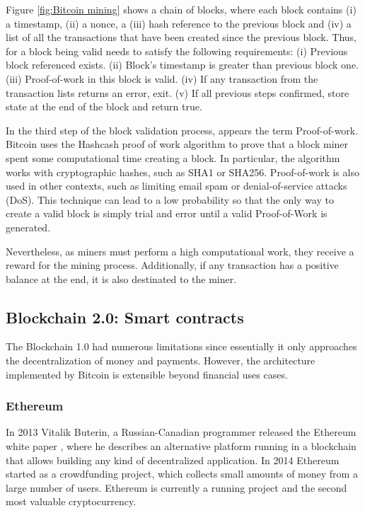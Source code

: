 Figure \ref{fig:Bitcoin mining} shows a chain of blocks, where each block contains (i) a timestamp, (ii) a nonce, a (iii) hash reference to the previous block and (iv) a list of all the transactions that have been created since the previous block. Thus, for a block being valid needs to satisfy the following requirements: \newline (i) Previous block referenced exists. (ii) Block's timestamp is greater than previous block one. (iii) Proof-of-work in this block is valid. (iv) If any transaction from the transaction lists returns an error, exit. (v) If all previous steps confirmed, store state at the end of the block and return true.

In the third step of the block validation process, appears the term Proof-of-work. Bitcoin uses the Hashcash proof of work algorithm to prove that a block miner spent some computational time creating a block. In particular, the algorithm works with cryptographic hashes, such as SHA1 or SHA256. Proof-of-work is also used in other contexts, such as limiting email spam or denial-of-service attacks (DoS). This technique can lead to a low probability so that the only way to create a valid block is simply trial and error until a valid Proof-of-Work is generated.

Nevertheless, as miners must perform a high computational work, they receive a reward for the mining process. Additionally, if any transaction has a positive balance at the end, it is also destinated to the miner.


\subsection{Blockchain 2.0: Smart contracts}

The Blockchain 1.0 had numerous limitations since essentially it only approaches the decentralization of money and payments. However, the architecture implemented by Bitcoin is extensible beyond financial uses cases.

\subsubsection{Ethereum}

In 2013 Vitalik Buterin, a Russian-Canadian programmer released the Ethereum white paper \cite{buterin2014next}, where he describes an alternative platform running in a blockchain that allows building any kind of decentralized application. In 2014 Ethereum started as a crowdfunding project, which collects small amounts of money from a large number of users.  Ethereum is currently a running project and the second most valuable cryptocurrency.


